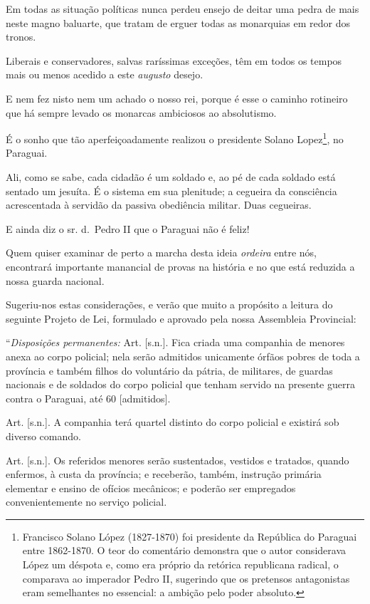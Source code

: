 Em todas as situação políticas nunca perdeu ensejo de deitar uma pedra
de mais neste magno baluarte, que tratam de erguer todas as monarquias
em redor dos tronos.

Liberais e conservadores, salvas raríssimas exceções, têm em todos os
tempos mais ou menos acedido a este \emph{augusto} desejo.

E nem fez nisto nem um achado o nosso rei, porque é esse o caminho
rotineiro que há sempre levado os monarcas ambiciosos ao absolutismo.

É o sonho que tão aperfeiçoadamente realizou o presidente Solano
Lopez\footnote{Francisco Solano López (1827-1870) foi presidente da
  República do Paraguai entre 1862-1870. O teor do comentário demonstra
  que o autor considerava López um déspota e, como era próprio da
  retórica republicana radical, o comparava ao imperador Pedro II,
  sugerindo que os pretensos antagonistas eram semelhantes no essencial:
  a ambição pelo poder absoluto.}, no Paraguai.

Ali, como se sabe, cada cidadão é um soldado e, ao pé de cada soldado
está sentado um jesuíta. É o sistema em sua plenitude; a cegueira da
consciência acrescentada à servidão da passiva obediência militar. Duas
cegueiras.

E ainda diz o sr. d.~Pedro II que o Paraguai não é feliz!

Quem quiser examinar de perto a marcha desta ideia \emph{ordeira} entre
nós, encontrará importante manancial de provas na história e no que está
reduzida a nossa guarda nacional.

Sugeriu-nos estas considerações, e verão que muito a propósito a leitura
do seguinte Projeto de Lei, formulado e aprovado pela nossa Assembleia
Provincial:

``\emph{Disposições permanentes:} Art. {[}s.n.{]}. Fica criada uma
companhia de menores anexa ao corpo policial; nela serão admitidos
unicamente órfãos pobres de toda a província e também filhos do
voluntário da pátria, de militares, de guardas nacionais e de soldados
do corpo policial que tenham servido na presente guerra contra o
Paraguai, até 60 {[}admitidos{]}.

Art. {[}s.n.{]}. A companhia terá quartel distinto do corpo policial e
existirá sob diverso comando.

Art. {[}s.n.{]}. Os referidos menores serão sustentados, vestidos e
tratados, quando enfermos, à custa da província; e receberão, também,
instrução primária elementar e ensino de ofícios mecânicos; e poderão
ser empregados convenientemente no serviço policial.

